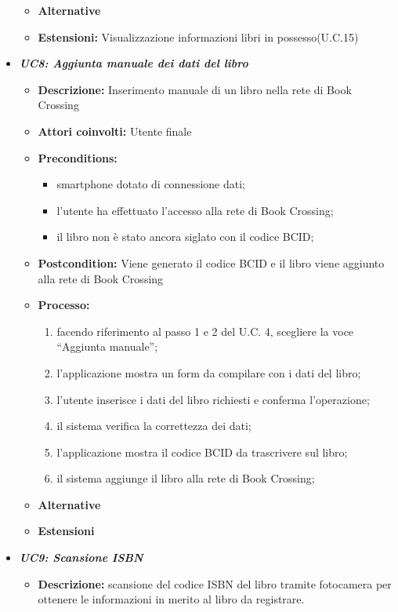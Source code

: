 \begin{itemize}
\begin{itemize}
		\item \textbf{Alternative}
		\item \textbf{Estensioni: } Visualizzazione informazioni libri in possesso(U.C.15)
	\end{itemize}
	\item \textbf{\textit{UC8: Aggiunta manuale dei dati del libro}}
	\begin{itemize}
		\item \textbf{Descrizione:} Inserimento manuale di un libro nella rete di Book Crossing
		\item \textbf{Attori coinvolti:} Utente finale
		\item \textbf{Preconditions:}
		\begin{itemize}
			\item smartphone dotato di connessione dati;
			\item l’utente ha effettuato l’accesso alla rete di Book Crossing;
			\item il libro non è stato ancora siglato con il codice BCID;
		\end{itemize}
		\item \textbf{Postcondition:} Viene generato il codice BCID e il libro viene aggiunto alla rete di Book Crossing
		\item \textbf{Processo: }
		\begin{enumerate}
			\item facendo riferimento al passo 1 e 2 del U.C. 4, scegliere la voce “Aggiunta manuale”;
			\item l’applicazione mostra un form da compilare con i dati del libro;
			\item l’utente inserisce i dati del libro richiesti e conferma l’operazione;
			\item il sistema verifica la correttezza dei dati;
			\item l’applicazione mostra il codice BCID da trascrivere sul libro;
			\item il sistema aggiunge il libro alla rete di Book Crossing;
		\end{enumerate}
		\item \textbf{Alternative}
		\item \textbf{Estensioni}
	\end{itemize}
	\item \textbf{\textit{UC9: Scansione ISBN}}
	\begin{itemize}
		\item \textbf{Descrizione:} scansione del codice ISBN del libro tramite fotocamera per ottenere le informazioni in merito al libro da registrare.

\end{itemize}
\end{itemize}

